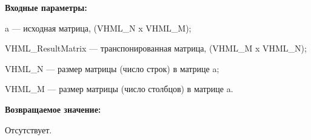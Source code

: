 \textbf{Входные параметры:}

 a --- исходная матрица, (VHML\_N x VHML\_M);
 
 VHML\_ResultMatrix --- транспонированная матрица, (VHML\_M x VHML\_N);
 
 VHML\_N --- размер матрицы (число строк) в матрице a;
 
 VHML\_M --- размер матрицы (число столбцов) в матрице a.

\textbf{Возвращаемое значение:}

Отсутствует.